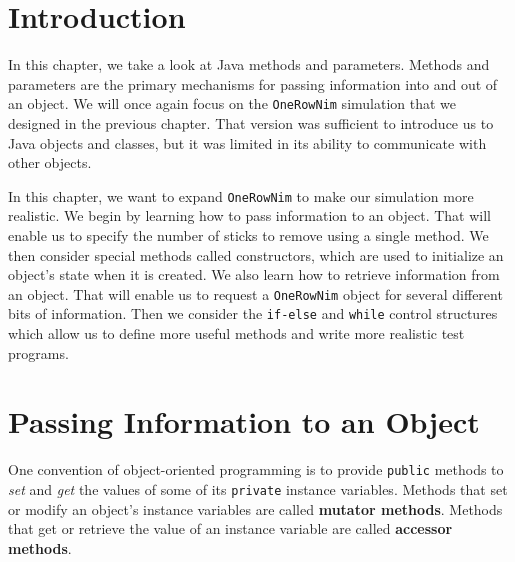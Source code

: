 \section{Introduction}
\label{introduction}

\noindent In this chapter, we take a look at Java methods and parameters.
Methods and parameters are the primary mechanisms for passing
information into and out of an object.  We will once again focus on
the {\tt OneRowNim} simulation that we designed in the previous chapter.
That version was sufficient to introduce us to Java
objects and classes, but it was limited in its ability to
communicate with other objects.

In this chapter, we want to expand {\tt OneRowNim} to make our
simulation more realistic.  We begin by learning how to pass
information to an object.  That will enable us to specify the number of
sticks to remove using a single method.  We then consider special
methods called constructors, which
are used to initialize an object's state when it is created.   We also
learn how to retrieve information from an object.  That will enable us
to request a {\tt OneRowNim} object for several different bits of information.
Then we consider the {\tt if-else} and {\tt while} control structures
which allow us to define more useful methods and write more realistic
test programs.

\section{Passing Information to an Object}
\label{passing-informationtoan-object}
\noindent  One convention of object-oriented programming is to
provide {\tt public} methods to {\it set} and {\it get} the values of
some of its {\tt private} instance variables. Methods that set or
modify an object's instance variables are called {\bf mutator methods}.
Methods that get or retrieve the value of an instance variable are
called {\bf accessor methods}.



